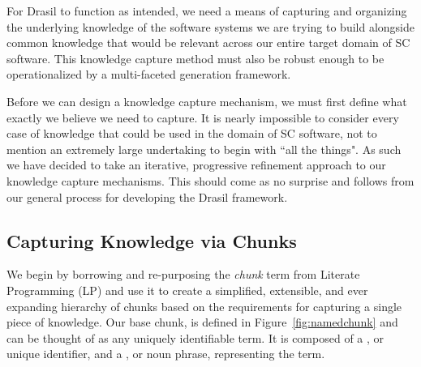 For Drasil to function as intended, we need a means of capturing and organizing 
the underlying knowledge of the software systems we are trying to build 
alongside common knowledge that would be relevant across our entire target 
domain of SC software. This knowledge capture method must also be robust enough 
to be operationalized by a multi-faceted generation framework.

Before we can design a knowledge capture mechanism, we must first define what 
exactly we believe we need to capture. It is nearly impossible to consider 
every case of knowledge that could be used in the domain of SC software, not to 
mention an extremely large undertaking to begin with ``all the things". As 
such we have decided to take an iterative, progressive refinement approach to 
our knowledge capture mechanisms. This should come as no surprise and follows 
from our general process for developing the Drasil framework.

\subsection{Capturing Knowledge via Chunks}
\label{sec:kcChunk}

We begin by borrowing and re-purposing the \emph{chunk} term from Literate 
Programming (LP) and use it to create a simplified, extensible, and ever 
expanding hierarchy  of chunks based on the requirements for capturing a single 
piece of knowledge. Our base chunk,  is defined in 
Figure~\ref{fig:namedchunk} and can be thought of as any uniquely identifiable 
term. It is composed of a , or unique identifier, and a 
, or noun phrase, representing the term.


